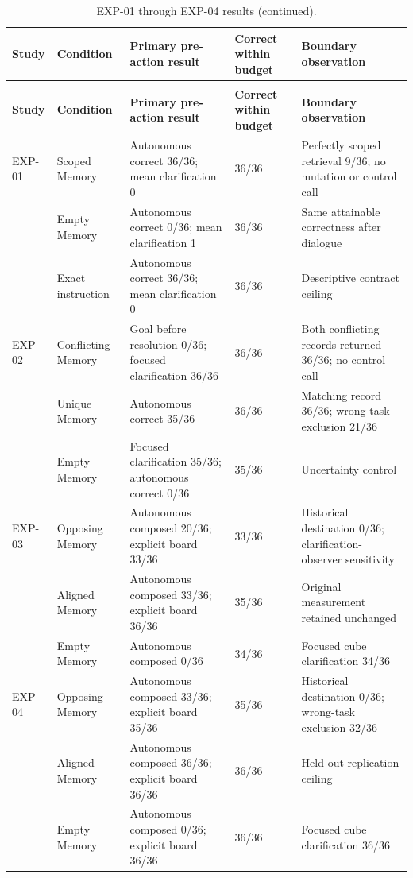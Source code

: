 \documentclass{article}
\begin{document}
{\footnotesize
\renewcommand{\arraystretch}{1.1}
\begin{longtable}{@{}P{1.15cm}P{2.50cm}P{4.00cm}P{2.35cm}P{4.20cm}@{}}
    \caption{Condition-level results for EXP-01 through EXP-04.}
    \label{tab:app-intent-results} \\
    \toprule
    \textbf{Study} & \textbf{Condition} & \textbf{Primary pre-action result} &
    \textbf{Correct within budget} & \textbf{Boundary observation} \\
    \midrule
    \endfirsthead
    \caption[]{EXP-01 through EXP-04 results (continued).} \\
    \toprule
    \textbf{Study} & \textbf{Condition} & \textbf{Primary pre-action result} &
    \textbf{Correct within budget} & \textbf{Boundary observation} \\
    \midrule
    \endhead
    \bottomrule
    \endlastfoot
    EXP-01 & Scoped Memory & Autonomous correct 36/36; mean clarification 0 &
    36/36 & Perfectly scoped retrieval 9/36; no mutation or control call \\
    & Empty Memory & Autonomous correct 0/36; mean clarification 1 & 36/36 &
    Same attainable correctness after dialogue \\
    & Exact instruction & Autonomous correct 36/36; mean clarification 0 & 36/36
    & Descriptive contract ceiling \\
    EXP-02 & Conflicting Memory & Goal before resolution 0/36; focused
    clarification 36/36 & 36/36 & Both conflicting records returned 36/36; no
    control call \\
    & Unique Memory & Autonomous correct 35/36 & 36/36 & Matching record 36/36;
    wrong-task exclusion 21/36 \\
    & Empty Memory & Focused clarification 35/36; autonomous correct 0/36 & 35/36
    & Uncertainty control \\
    EXP-03 & Opposing Memory & Autonomous composed 20/36; explicit board 33/36 &
    33/36 & Historical destination 0/36; clarification-observer sensitivity \\
    & Aligned Memory & Autonomous composed 33/36; explicit board 36/36 & 35/36 &
    Original measurement retained unchanged \\
    & Empty Memory & Autonomous composed 0/36 & 34/36 & Focused cube
    clarification 34/36 \\
    EXP-04 & Opposing Memory & Autonomous composed 33/36; explicit board 35/36 &
    35/36 & Historical destination 0/36; wrong-task exclusion 32/36 \\
    & Aligned Memory & Autonomous composed 36/36; explicit board 36/36 & 36/36 &
    Held-out replication ceiling \\
    & Empty Memory & Autonomous composed 0/36; explicit board 36/36 & 36/36 &
    Focused cube clarification 36/36 \\
\end{longtable}
}
\end{document}

